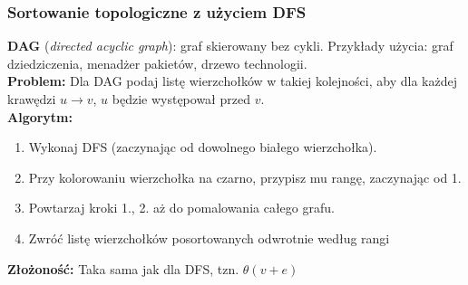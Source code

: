 \documentclass[12pt]{article}
\begin{document}
            \newpage

            \subsubsection{Sortowanie topologiczne z użyciem DFS}
            \[\]
            \textbf{DAG} (\textit{directed acyclic graph}):
            graf skierowany bez cykli. Przykłady użycia: graf dziedziczenia, menadżer pakietów,
            drzewo technologii.
            \[\]
            \textbf{Problem:} Dla DAG podaj listę wierzchołków w takiej kolejności,
            aby dla każdej krawędzi $u \rightarrow v$, $u$ będzie występował przed $v$.
            \[\]
            \textbf{Algorytm:} 
            \begin{enumerate}
                \item Wykonaj DFS (zaczynając od dowolnego białego wierzchołka).
                \item Przy kolorowaniu wierzchołka na czarno, przypisz mu rangę, zaczynając od 1.
                \item Powtarzaj kroki 1., 2. aż do pomalowania całego grafu.
                \item Zwróć listę wierzchołków posortowanych odwrotnie według rangi
            \end{enumerate}
            \[\]
            \textbf{Złożoność:} Taka sama jak dla DFS, tzn. $\theta(v + e)$ 
\end{document}
